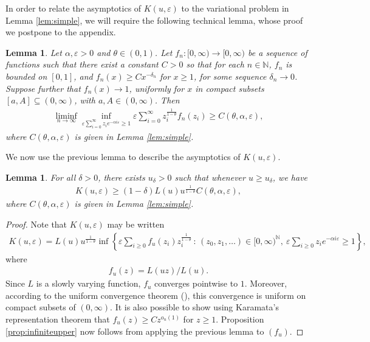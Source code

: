 \documentclass[a4,12pt]{amsart}
\numberwithin{equation}{section}
\newtheorem{lemma}[thm]{Lemma}
\begin{document}
	In order to relate the asymptotics of $K(u,\varepsilon)$ to the variational 
	problem in Lemma \ref{lem:simple}, we will require the following technical lemma, whose proof we postpone to the appendix.

	\begin{lemma} \label{lem:tech}
		Let $\alpha,\varepsilon > 0$ and $\theta \in (0,1)$. Let $f_n:[0,\infty) \to [0,\infty)$ be a sequence of functions 
		such that there exist a constant $C>0$ so that for each $n\in\mathbb N$, 
		$f_n$ is bounded on $[0,1]$, and 
		$f_n(x) \geq C x^{ - \delta_n}$ for $x \geq 1$, for some 
		sequence $\delta_n \to 0$. 
		Suppose further that $f_n(x) \to 1$, uniformly for $x$ in 
		compact subsets $[a,A] \subseteq (0,\infty)$, with $a,A\in(0,\infty)$. Then
		\begin{align*}
			\liminf_{n \to \infty} 
			\inf_{ \varepsilon \sum_{i=0}^{\infty} z_ie^{ - \alpha i \varepsilon} \geq 1  } 
			\varepsilon  \sum_{i=0}^{\infty} z_i^{\frac{1}{1-\theta}}f_n(z_i) 
			\geq C(\theta,\alpha,\varepsilon),
		\end{align*}
		where $C(\theta,\alpha,\varepsilon)$ is given in Lemma \ref{lem:simple}.
	\end{lemma}


	We now use the previous lemma to describe the asymptotics of $K(u,\varepsilon)$.

	\begin{lemma} \label{lem:Klower}
		For all $\delta > 0$, there exists $u_\delta >0$
		such that whenever $u \geq u_\delta$, we have 
		\begin{align*}
			K(u,\varepsilon) 
			\geq (1-\delta) L(u) u^{\frac{1}{1-\theta}} C(\theta,\alpha,\varepsilon),
		\end{align*}
        where $C(\theta,\alpha,\varepsilon)$ is given in Lemma \ref{lem:simple}.
	\end{lemma}

	\begin{proof}
		Note that $K(u,\varepsilon)$ may be written
		\begin{align*}
			K(u,\varepsilon) = L(u)u^{\frac{1}{1-\theta}} 
			\inf \left\{  \varepsilon \sum_{ i \geq 0}  f_u(z_i) z_i^{\frac{1}{1-\theta}}  
			\,:\, (z_0,z_1,\ldots)\in[0,\infty)^{\mathbb{N}}, \: 
			\varepsilon \sum_{ i \geq 0}z_i e^{ - \alpha i \varepsilon } \geq 1 \right\},
		\end{align*}
		where
		\begin{align*}
			f_u(z) = L(uz)/L(u).
		\end{align*}
		Since $L$ is a slowly varying function, 
		$f_u$ converges pointwise to $1$. 
		Moreover, according to the uniform convergence theorem 
		(\cite[Section 1.2]{bingham1989regular}), this convergence is 
		uniform on compact subsets of $(0,\infty)$. It is also possible to show 
		using Karamata's representation theorem \cite[Section 1.3]{bingham1989regular} 
		that $f_u(z) \geq C z^{ o_u(1)}$ for $z \geq 1$. 
		Proposition \ref{prop:infiniteupper} now follows 
		from applying the previous lemma to $(f_u)$. 
	\end{proof}
\end{document}
